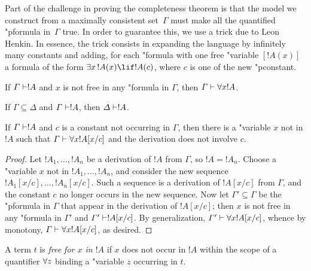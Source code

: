 \documentclass[../../include/open-logic-section]{subfiles}
\begin{document}

\begin{explain}
Part of the challenge in proving the completeness theorem is that the
model we construct from a maximally consistent set~$\Gamma$ must make
all the quantified "p{formula} in~$\Gamma$ true.  In order to guarantee
this, we use a trick due to Leon Henkin.  In essence, the trick
consists in expanding the language by infinitely many constants and
adding, for each "{formula} with one free "{variable} $[!A(x)]$ a formula of
the form $\lexists[x][!A(x)] \lif !A(c)$, where $c$ is one of the new
"p{constant}.  
\end{explain}

\begin{prop}[Generalization]
If $\Gamma \Proves !A$ and $x$ is not free in any "{formula} in $\Gamma$, 
then $\Gamma \Proves \lforall[x] !A$.
\end{prop}

\begin{prop}[Monotony]
If $\Gamma \subseteq \Delta$ and $\Gamma \Proves !A$, then $\Delta \Proves !A$.
\end{prop}

\begin{thm}
If $\Gamma \Proves !A$ and $c$ is a constant not occurring in
$\Gamma$, then there is a "{variable} $x$ not in $!A$ such that $\Gamma
\Proves \lforall[x] !A [x/c]$ and the derivation does not involve $c$.
\end{thm}

\begin{proof}
Let $!A_1, \dots, !A_n$ be a derivation of $!A$ from $\Gamma$, so $!A
= !A_n$.  Choose a "{variable} $x$ not in $!A_1, \dots, !A_n$, and
consider the new sequence $!A_1[x/c], \dots, !A_n [x/c]$. Such a
sequence is a derivation of $!A[x/c]$ from $\Gamma$, and the constant
$c$ no longer occurs in the new sequence.
Now let $\Gamma' \subseteq \Gamma$ be the "p{formula} in $\Gamma$ that
appear in the derivation of $!A [x/c]$; then $x$ is not free in any
"{formula} in $\Gamma'$ and $\Gamma' \Proves !A [x/c]$. By
generalization, $\Gamma' \Proves \lforall[x] !A[x/c]$, whence by
monotony, $\Gamma \Proves \lforall[x] !A [x/c]$, as desired.
\end{proof}

\begin{defn} 
A term $t$ is \emph{free for $x$ in $!A$} if $x$ does not occur in
$!A$ within the scope of a quantifier $\lforall[z]$ binding a "{variable}
$z$ occurring in $t$.
\end{defn}
\end{document}
